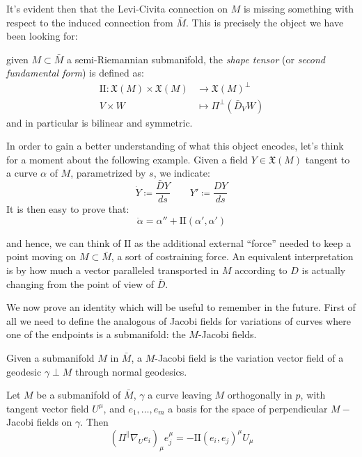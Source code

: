 It's evident then that the Levi-Civita connection on \(M\) is missing something with respect to the induced connection from \(\bar{M}\). This is precisely the object we have been looking for:

\begin{definition}
	given \(M \subset \bar{M}\) a semi-Riemannian submanifold, the \emph{shape tensor} (or \emph{second fundamental form}) is defined as:
	\begin{align*}
		\mathrm{I\!I} : \mathfrak{X}(M) \times \mathfrak{X}(M) &\longrightarrow \mathfrak{X}(M)^{\perp}\\
							V \times W &\mapsto \Pi^{\perp}\left(\bar{D}_V W\right)
	\end{align*}
	\noindent and in particular is bilinear and symmetric.
\end{definition}

In order to gain a better understanding of what this object encodes, let's think for a moment about the following example. Given a field \(Y \in \mathfrak{X}(M)\) tangent to a curve \(\alpha\) of \(M\), parametrized by \(s\), we indicate:
\[
\dot{Y} \coloneqq \frac{\bar{D}Y}{ds} \quad \quad Y' \coloneqq \frac{DY}{ds}
\]
It is then easy to prove that:
\[
\ddot{\alpha} = \alpha'' + \mathrm{I\!I}(\alpha', \alpha')
\]

and hence, we can think of \(\mathrm{I\!I}\) as the additional external ``force'' needed to keep a point moving on \(M \subset \bar{M}\), a sort of costraining force. An equivalent interpretation is by how much a vector paralleled transported in \(M\) according to \(D\) is actually changing from the point of view of \(\bar{D}\).


We now prove an identity which will be useful to remember in the future. First of all we need to define the analogous of Jacobi fields for variations of curves where one of the endpoints is a submanifold: the \(M\)-Jacobi fields.
\begin{definition}
	Given a submanifold \(M\) in \(\bar{M}\), a \(M\)-Jacobi field is the variation vector field of a geodesic \(\gamma \perp M\) through normal geodesics.
\end{definition}
\begin{lemma}
	\label{lemma:shape-identity}
	Let \(M\) be a submanifold of \(\bar{M}\), \(\gamma\) a curve leaving \(M\) orthogonally in \(p\), with tangent vector field \(U^{\mu}\), and \(e_1, \ldots, e_m\) a basis for the space of perpendicular \(M-\)Jacobi fields on \(\gamma\).
	Then 
	\begin{equation}
		(\Pi^{\parallel}\nabla_Ue_i)_{\mu}e_j^{\mu} = - \mathrm{I\!I}(e_i, e_j)^{\mu}U_{\mu}
	\end{equation}
\end{lemma}

